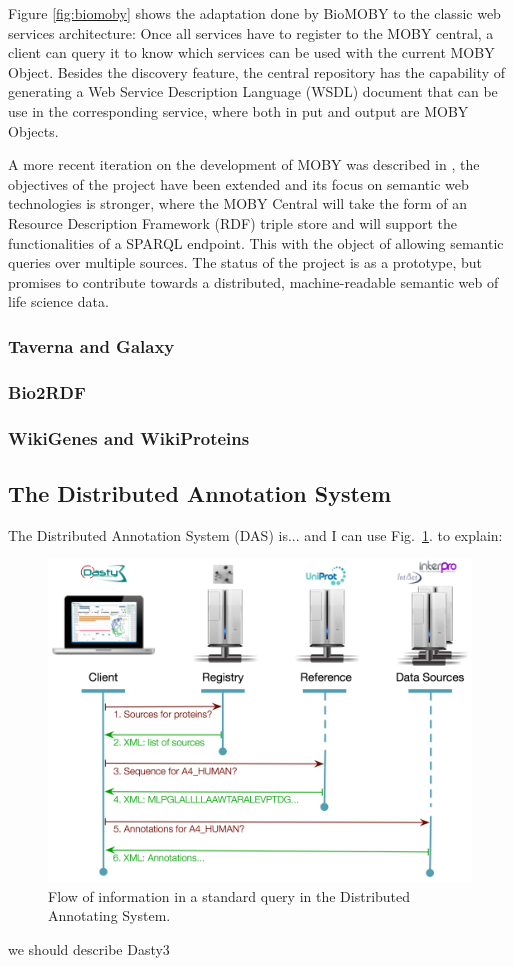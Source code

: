 Figure \ref{fig:biomoby} shows the adaptation done by BioMOBY to the classic web services architecture: Once all services have to register to the MOBY central, a client can query it to know which services can be used with the current MOBY Object. Besides the discovery feature, the central repository has the capability of generating a Web Service Description Language (WSDL) document that can be use in the corresponding service, where both in put and output are MOBY Objects.

A more recent iteration on the development of MOBY was described in \cite{VAN2009}, the objectives of the project have been extended and its focus on semantic web technologies is stronger, where the MOBY Central will take the form of an Resource Description Framework (RDF) triple store and will support the functionalities of a SPARQL endpoint. This with the object of allowing semantic queries over multiple sources. The status of the project is as a prototype, but promises to contribute towards a distributed, machine-readable semantic web of life science data.

\subsubsection{Taverna and Galaxy}
\subsubsection{Bio2RDF}
\subsubsection{WikiGenes and WikiProteins}

\subsection{The Distributed Annotation System}
The Distributed Annotation System (DAS) is... \cite{JEN2008} and I can use Fig.~\ref{fig:das}. to explain:
\begin{figure}  
\includegraphics[width=\textwidth]{figures/DAS.png}
\caption[DAS Flow of Information.]{Flow of information in a standard query in the Distributed Annotating System.
\label{fig:das}}
\end{figure}
we should describe Dasty3 \cite{VIL2011}

